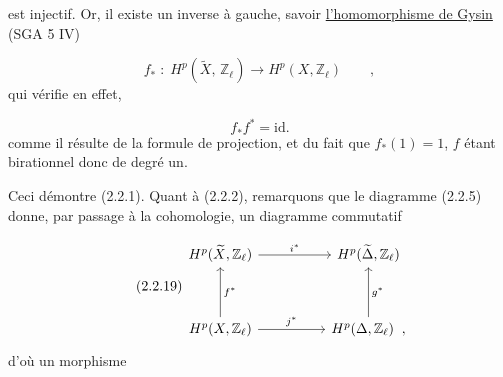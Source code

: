 
 est injectif. Or, il existe un inverse à gauche, savoir \underline{l'homomorphisme de Gysin} \quad (SGA 5 IV)

\begin{equation}\tag{2.2.17}
f_{*} \;:\; H^{p}(\widetilde{X},\,\mathbb{Z}_{\ell}) \longrightarrow H^{p}(X,\mathbb{Z}_{\ell}) \qquad ,
\end{equation}
qui vérifie en effet,

\begin{equation}\tag{2.2.18}
f_{*}f^{*} = \mathrm{id}.
\end{equation}
comme il résulte de la formule de projection, et du fait que $f_{*}(1) = 1$, $f$ étant birationnel donc de degré un.

Ceci démontre (2.2.1). Quant à (2.2.2), remarquons que le diagramme (2.2.5) donne, par passage à la cohomologie, un diagramme commutatif

\begin{equation}\tag{2.2.19}
\begin{tikzcd}[row sep=huge, column sep=huge]
H^{p}(\widetilde{X},\mathbb{Z}_{\ell}) \arrow[r, "i^{*}"] & H^{p}(\widetilde{\Delta},\mathbb{Z}_{\ell}) \\
H^{p}(X,\mathbb{Z}_{\ell}) \arrow[r, "j^{*}"] \arrow[u, "f^{*}"'] & H^{p}(\Delta,\mathbb{Z}_{\ell}) \;\;, \arrow[u, "g^{*}"']
\end{tikzcd}
\end{equation}
d'où un morphisme

